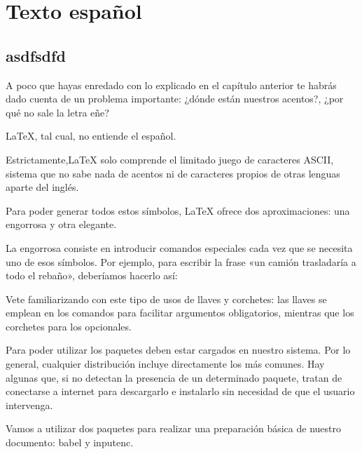 \chapter{Texto español}

\section{ asdfsdfd }
A poco que hayas enredado con lo explicado en el capítulo anterior te habrás dado cuenta de un problema importante: ¿dónde están nuestros acentos?, ¿por qué no sale la letra eñe?

\LaTeX{}, tal cual, no entiende el español.

Estrictamente,\LaTeX{} solo comprende el limitado juego de caracteres ASCII, sistema que no sabe nada de acentos ni de caracteres propios de otras lenguas aparte del inglés.

Para poder generar todos estos símbolos, \LaTeX{} ofrece dos aproximaciones: una engorrosa y otra elegante.

La engorrosa consiste en introducir comandos especiales cada vez que se necesita uno de esos símbolos. Por ejemplo, para escribir la frase «un camión trasladaría a todo el rebaño», deberíamos hacerlo así:

Vete familiarizando con este tipo de usos de llaves y corchetes: las llaves se emplean en los comandos para facilitar argumentos obligatorios, mientras que los corchetes para los opcionales.

Para poder utilizar los paquetes deben estar cargados en nuestro sistema. Por lo general, cualquier distribución incluye directamente los más comunes. Hay algunas que, si no detectan la presencia de un determinado paquete, tratan de conectarse a internet para descargarlo e instalarlo sin necesidad de que el usuario intervenga.

Vamos a utilizar dos paquetes para realizar una preparación básica de nuestro documento: babel y inputenc.
